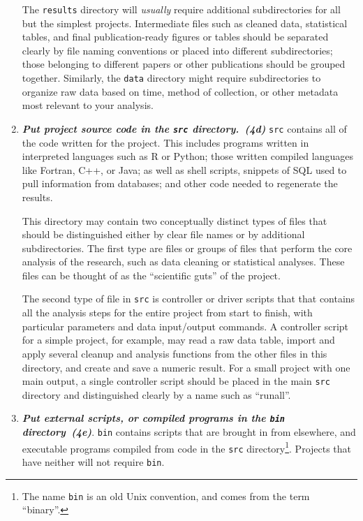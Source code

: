 \documentclass[10pt,letterpaper]{article}
\newcommand{\practice}[2]{\textbf{\emph{{#2}~({#1})}}}
\begin{document}
\begin{enumerate}
  The \texttt{results} directory will \emph{usually} require
  additional subdirectories for all but the simplest
  projects. Intermediate files such as cleaned data, statistical
  tables, and final publication-ready figures or tables should be
  separated clearly by file naming conventions or placed into
  different subdirectories; those belonging to different papers or
  other publications should be grouped together. Similarly, the
  \texttt{data} directory might require subdirectories to organize raw
  data based on time, method of collection, or other metadata most
  relevant to your analysis.

\item

  \practice{4d}{Put project source code in the \texttt{src}
  directory.}  \texttt{src} contains all of the code written for the
  project. This includes programs written in interpreted languages
  such as R or Python; those written compiled languages like Fortran,
  C++, or Java; as well as shell scripts, snippets of SQL used to pull
  information from databases; and other code needed to regenerate the
  results.

  This directory may contain two conceptually distinct types of files
  that should be distinguished either by clear file names or by
  additional subdirectories. The first type are files or groups of
  files that perform the core analysis of the research, such as data
  cleaning or statistical analyses.  These files can be thought of as
  the ``scientific guts'' of the project.

  The second type of file in \texttt{src} is controller or driver
  scripts that that contains all the analysis steps for the entire
  project from start to finish, with particular parameters and data
  input/output commands. A controller script for a simple project, for
  example, may read a raw data table, import and apply several cleanup
  and analysis functions from the other files in this directory, and
  create and save a numeric result. For a small project with one main
  output, a single controller script should be placed in the main
  \texttt{src} directory and distinguished clearly by a name such as
  ``runall''.

\item

  \practice{4e}{Put external scripts, or compiled programs in the
  \texttt{bin} directory}.  \texttt{bin} contains scripts that are
  brought in from elsewhere, and executable programs compiled from
  code in the \texttt{src} directory\footnote{The name \texttt{bin} is
  an old Unix convention, and comes from the term
  ``binary''.}. Projects that have neither will not require
  \texttt{bin}.


\end{enumerate}
\end{document}
